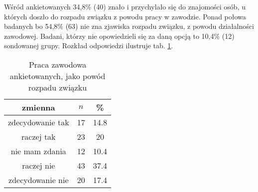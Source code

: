 

Wśród ankietowanych 34,8\% (40) znało i przychylało się do znajomości osób, u których doszło do rozpadu związku z powodu pracy w zawodzie. Ponad połowa badanych bo 54,8\% (63) nie zna zjawiska rozpadu związku, z powodu działalności zawodowej. Badani, którzy nie opowiedzieli się za daną opcją to 10,4\% (12) sondowanej grupy. Rozkład odpowiedzi ilustruje tab. \ref{tab:Q29}.

\begin{table}[H]
\caption{Praca zawodowa ankietowanych, jako powód rozpadu związku}
\centering
\begin{tabular}{ | c | c | c |}
\hline
zmienna & $n$ & \% \\
\hline
zdecydowanie tak  &  17  & 14.8 \\
\hline
raczej tak  &  23  & 20 \\
\hline
nie mam zdania  &  12  & 10.4\\
\hline
raczej nie  &  43  & 37.4\\
\hline
zdecydowanie nie  &  20  & 17.4 \\
\hline
\end{tabular}
\label{tab:Q29}
\end{table}
